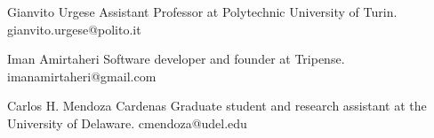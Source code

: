 

\begin{cvrefs}

    \cvref
    {Gianvito Urgese}
    {Assistant Professor at Polytechnic University of Turin.}
	{gianvito.urgese@polito.it}

    \cvref
    {Iman Amirtaheri}
    {Software developer and founder at Tripense.}
	{imanamirtaheri@gmail.com}

    \cvref
    {Carlos H. Mendoza Cardenas}
    {Graduate student and research assistant at the University of Delaware.}
	{cmendoza@udel.edu}

\end{cvrefs}
